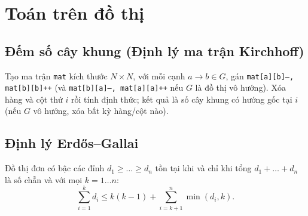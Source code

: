 \section{Toán trên đồ thị}
	\subsection{Đếm số cây khung (Định lý ma trận Kirchhoff)}
		Tạo ma trận \texttt{mat} kích thước $N\times N$, với mỗi cạnh $a \rightarrow b \in G$, gán
		\texttt{mat[a][b]--, mat[b][b]++} (và \texttt{mat[b][a]--, mat[a][a]++} nếu $G$ là đồ thị vô hướng).
		Xóa hàng và cột thứ $i$ rồi tính định thức; kết quả là số cây khung có hướng gốc tại $i$
		(nếu $G$ vô hướng, xóa bất kỳ hàng/cột nào).

	\subsection{Định lý Erdős–Gallai}
		Đồ thị đơn có bậc các đỉnh $d_1 \ge \dots \ge d_n$ tồn tại khi và chỉ khi tổng $d_1 + \dots + d_n$ là số chẵn và với mọi $k = 1\dots n$:
		\[ \sum _{i=1}^{k}d_{i}\leq k(k-1)+\sum _{i=k+1}^{n}\min(d_{i},k). \]
